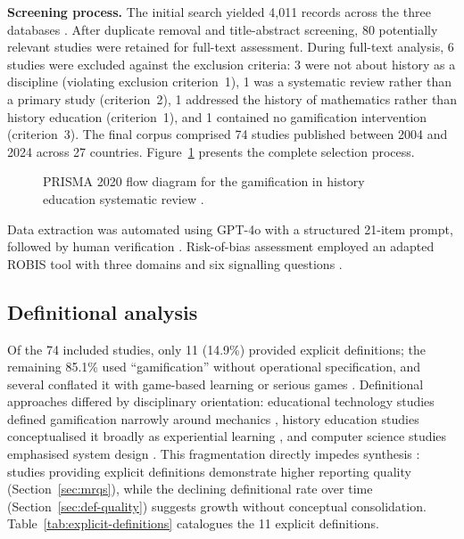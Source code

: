 \textbf{Screening process.} The initial search yielded 4,011 records across the three databases \cite{KorniienkoSemerikov2024}. After duplicate removal and title-abstract screening, 80 potentially relevant studies were retained for full-text assessment. During full-text analysis, 6 studies were excluded against the exclusion criteria: 3 were not about history as a discipline (violating exclusion criterion~1), 1 was a systematic review rather than a primary study (criterion~2), 1 addressed the history of mathematics rather than history education (criterion~1), and 1 contained no gamification intervention (criterion~3). The final corpus comprised 74 studies published between 2004 and 2024 across 27 countries. Figure~\ref{fig:gamification-prisma} presents the complete selection process.

\begin{figure}[!h]
\centering

\caption{PRISMA 2020 flow diagram for the gamification in history education systematic review \citep{KorniienkoSemerikov2024}.}
\label{fig:gamification-prisma}
\end{figure}

Data extraction was automated using GPT-4o with a structured 21-item prompt, followed by human verification \cite{Rubinstein2025, MalekiKarami2024}. Risk-of-bias assessment employed an adapted ROBIS tool with three domains and six signalling questions \cite{Whiting2016, HigginsThomas2019}.

\subsection{Definitional analysis} \label{sec:definitional-analysis}

Of the 74 included studies, only 11 (14.9\%) provided explicit definitions; the remaining 85.1\% used ``gamification'' without operational specification, and several conflated it with game-based learning or serious games \cite{36Scholz2021, 42Huffer201581}. Definitional approaches differed by disciplinary orientation: educational technology studies defined gamification narrowly around mechanics \cite{Deterding2011, SEABORN201514}, history education studies conceptualised it broadly as experiential learning \cite{12Gilbert2019108, 55Squire2004}, and computer science studies emphasised system design \cite{Souza2018201}. This fragmentation directly impedes synthesis \cite{DichevDicheva2017, Buckley2018, Calderon2016}: studies providing explicit definitions demonstrate higher reporting quality (Section~\ref{sec:mrqs}), while the declining definitional rate over time (Section~\ref{sec:def-quality}) suggests growth without conceptual consolidation. Table~\ref{tab:explicit-definitions} catalogues the 11 explicit definitions.

